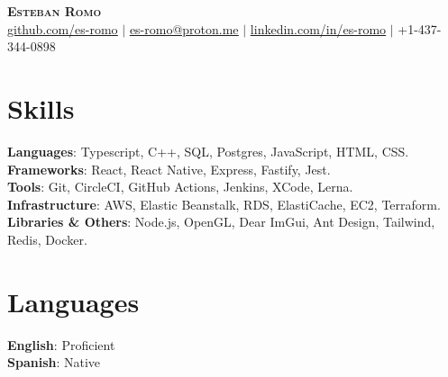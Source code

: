 \documentclass[letterpaper,11pt]{article}
\begin{document}
\begin{center}
    \textbf{\Huge \scshape Esteban Romo} \\ \vspace{1pt}
    \href{https://github.com/es-romo}{\underline{github.com/es-romo}} $|$ 
    \href{mailto:es-romo@proton.me}{\underline{es-romo@proton.me}} $|$ 
    \href{https://www.linkedin.com/in/es-romo/}{\underline{linkedin.com/in/es-romo}} $|$ 
    \small +1-437-344-0898
\end{center}

\begin{minipage}[t]{.78\textwidth}
  \section{Skills}
  \begin{itemize}[leftmargin=0.15in, label={}]
      \small{\item{
      \textbf{Languages}{: Typescript, C++, SQL, Postgres, JavaScript, HTML, CSS.} \\
      \textbf{Frameworks}{: React, React Native, Express, Fastify, Jest.} \\
      \textbf{Tools}{: Git, CircleCI, GitHub Actions, Jenkins, XCode, Lerna.} \\
      \textbf{Infrastructure}{: AWS, Elastic Beanstalk, RDS, ElastiCache, EC2, Terraform.} \\
      \textbf{Libraries \& Others}{: Node.js, OpenGL, Dear ImGui, Ant Design, Tailwind, Redis, Docker.} \\
      }}
  \end{itemize}
\end{minipage}\hspace{.02\textwidth}%
\begin{minipage}[t]{.20\textwidth}
  \section{Languages}
  \begin{itemize}[leftmargin=0.0in, label={}]
      \small{\item{
      \textbf{English}{: Proficient} \\
      \textbf{Spanish}{: Native} \\
      }}
  \end{itemize}
\end{minipage}\vspace{-10pt}
\end{document}
